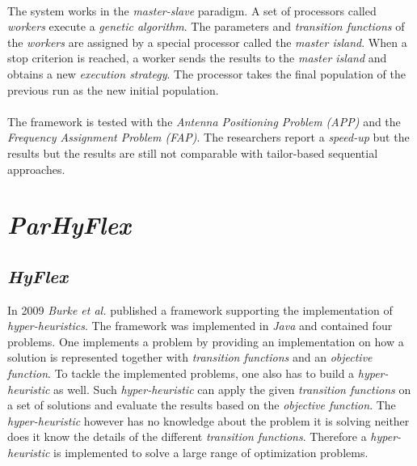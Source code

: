 \documentclass[a4paper,10pt]{article}
\newcommand{\seclab}[1]{\label{sec:#1}}
\theoremstyle{definition}
\begin{document}
\paragraph{}
The system works in the \emph{master-slave} paradigm. A set of processors called \emph{workers} execute a \emph{genetic algorithm}. The parameters and \emph{transition functions} of the \emph{workers} are assigned by a special processor called the \emph{master island}. When a stop criterion is reached, a worker sends the results to the \emph{master island} and obtains a new \emph{execution strategy}. The processor takes the final population of the previous run as the new initial population.%

\paragraph{}
The framework is tested with the \emph{Antenna Positioning Problem (APP)}\cite{} and the \emph{Frequency Assignment Problem (FAP)}\cite{}. The researchers report a \emph{speed-up} but the results but the results are still not comparable with tailor-based sequential approaches.



\section{\emph{ParHyFlex}}
\seclab{parhyflex}

\subsection{\emph{HyFlex}}
In 2009 \emph{Burke et al.}\cite{} published a framework supporting the implementation of \emph{hyper-heuristics}. The framework was implemented in \emph{Java} and contained four problems. One implements a problem by providing an implementation on how a solution is represented together with \emph{transition functions} and an \emph{objective function}. To tackle the implemented problems, one also has to build a \emph{hyper-heuristic} as well. Such \emph{hyper-heuristic} can apply the given \emph{transition functions} on a set of solutions and evaluate the results based on the \emph{objective function}. The \emph{hyper-heuristic} however has no knowledge about the problem it is solving neither does it know the details of the different \emph{transition functions}. Therefore a \emph{hyper-heuristic} is implemented to solve a large range of optimization problems.
\end{document}
